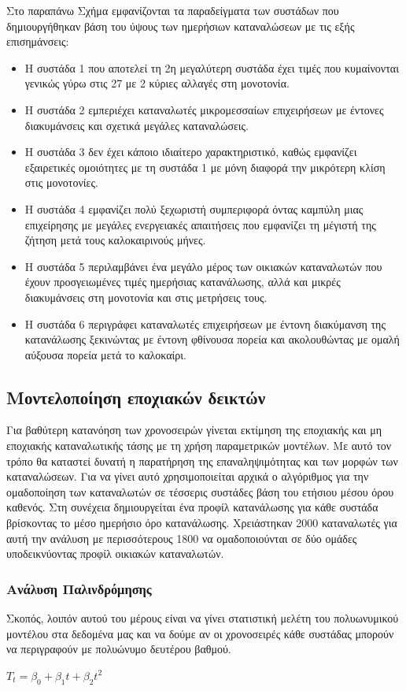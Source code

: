 Στο παραπάνω Σχήμα εμφανίζονται τα παραδείγματα των συστάδων που δημιουργήθηκαν βάση του ύψους των ημερήσιων καταναλώσεων με τις εξής επισημάνσεις:
\begin{itemize}
\item Η συστάδα 1 που αποτελεί τη 2η μεγαλύτερη συστάδα έχει τιμές που κυμαίνονται γενικώς γύρω στις 27  με 2 κύριες αλλαγές στη μονοτονία.
\item Η συστάδα 2 εμπεριέχει καταναλωτές μικρομεσσαίων επιχειρήσεων με έντονες διακυμάνσεις και σχετικά μεγάλες καταναλώσεις.
\item Η συστάδα 3 δεν έχει κάποιο ιδιαίτερο χαρακτηριστικό, καθώς εμφανίζει εξαιρετικές ομοιότητες με τη συστάδα 1 με μόνη διαφορά την μικρότερη κλίση στις μονοτονίες.
\item Η συστάδα 4 εμφανίζει πολύ ξεχωριστή συμπεριφορά όντας καμπύλη μιας επιχείρησης με μεγάλες ενεργειακές απαιτήσεις που εμφανίζει τη μέγιστή της ζήτηση μετά τους καλοκαιρινούς μήνες. 
\item Η συστάδα 5 περιλαμβάνει ένα μεγάλο μέρος των οικιακών καταναλωτών που έχουν προσγειωμένες τιμές ημερήσιας κατανάλωσης, αλλά και μικρές διακυμάνσεις στη μονοτονία και στις μετρήσεις τους.
\item Η συστάδα 6 περιγράφει καταναλωτές επιχειρήσεων με έντονη διακύμανση της κατανάλωσης ξεκινώντας με έντονη φθίνουσα πορεία και ακολουθώντας με ομαλή αύξουσα πορεία μετά το καλοκαίρι.
\end{itemize}

\subsection{Μοντελοποίηση εποχιακών δεικτών}
Για βαθύτερη κατανόηση των χρονοσειρών γίνεται εκτίμηση της εποχιακής και μη εποχιακής καταναλωτικής τάσης με τη χρήση παραμετρικών μοντέλων. Με αυτό τον τρόπο θα καταστεί δυνατή η παρατήρηση της επαναληψιμότητας και των μορφών των καταναλώσεων. Για να γίνει αυτό χρησιμοποιείται αρχικά ο αλγόριθμος  για την ομαδοποίηση των καταναλωτών σε τέσσερις συστάδες βάση του ετήσιου μέσου όρου καθενός. Στη συνέχεια δημιουργείται ένα προφίλ κατανάλωσης για κάθε συστάδα βρίσκοντας το μέσο ημερήσιο όρο κατανάλωσης. Χρειάστηκαν 2000 καταναλωτές για αυτή την ανάλυση με περισσότερους  1800 να ομαδοποιούνται σε δύο ομάδες υποδεικνύοντας προφίλ οικιακών καταναλωτών.
\subsubsection{Ανάλυση Παλινδρόμησης}
Σκοπός, λοιπόν αυτού του μέρους είναι να γίνει στατιστική μελέτη του πολυωνυμικού μοντέλου στα δεδομένα μας και να δούμε αν οι χρονοσειρές κάθε συστάδας μπορούν να περιγραφούν  με πολυώνυμο δευτέρου βαθμού. \cite{mathworkstrend}
\begin{center}
$T_t=\beta_0 + \beta_1t + \beta_2t^2$
\end{center}

